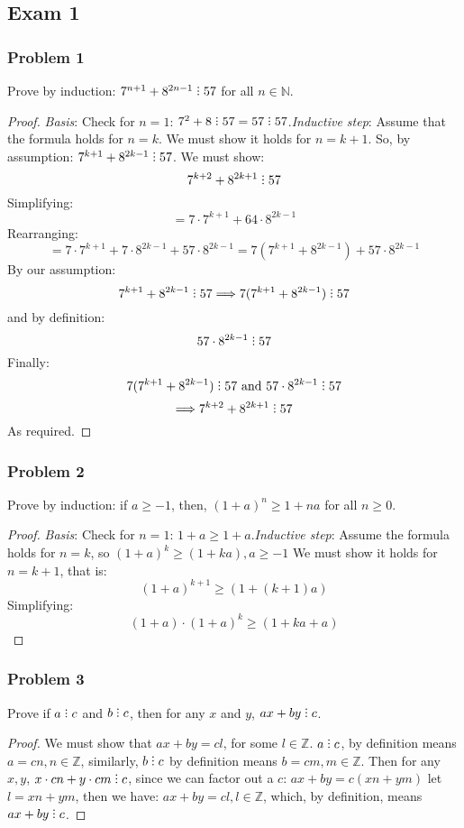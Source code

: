 \documentclass[hidelinks,12pt]{article}
\newcommand{\N}{\mathbb{N}}
\newcommand{\Z}{\mathbb{Z}}
\newcommand{\divby}{%
  \mathrel{\text{\vbox{\baselineskip.65ex\lineskiplimit0pt\hbox{.}\hbox{.}\hbox{.}}}}%
  }
\begin{document}
\subsection{Exam 1}
\subsubsection{Problem 1}
Prove by induction: $7^{n+1}+8^{2n-1}\divby57$ for all $n\in\N$.
\begin{proof}
\emph{Basis}: Check for $n=1$: $7^2+8\divby57=57\divby57$.\newline \emph{Inductive step}: Assume that the formula holds for $n=k$. We must show it holds for $n=k+1$. So, by assumption: $7^{k+1}+8^{2k-1}\divby57$. We must show: $$7^{k+2}+8^{2k+1}\divby57$$ Simplifying:$$=7\cdot7^{k+1}+64\cdot8^{2k-1}$$ Rearranging:$$=7\cdot7^{k+1}+7\cdot8^{2k-1}+57\cdot8^{2k-1}=7(7^{k+1}+8^{2k-1})+57\cdot8^{2k-1}$$By our assumption:$$7^{k+1}+8^{2k-1}\divby57\Longrightarrow 7(7^{k+1}+8^{2k-1})\divby57$$ and by definition:$$57\cdot8^{2k-1}\divby57$$ Finally:$$7(7^{k+1}+8^{2k-1})\divby57\text{ and } 57\cdot8^{2k-1}\divby57$$ $$\Longrightarrow 7^{k+2}+8^{2k+1}\divby57$$ As required.
\end{proof}
\subsubsection{Problem 2}
Prove by induction: if $a\geq-1$, then, $(1+a)^n\geq1+na$ for all $n\geq0$.
\begin{proof}
\emph{Basis}: Check for $n=1$: $1+a\geq1+a$.\newline \emph{Inductive step}: \newline Assume the formula holds for $n=k$, so $(1+a)^k\geq(1+ka), a\geq-1$ We must show it holds for $n=k+1$, that is: $$(1+a)^{k+1}\geq(1+(k+1)a)$$ Simplifying:$$(1+a)\cdot(1+a)^k\geq(1+ka+a)$$
\end{proof}
\subsubsection{Problem 3}
Prove if $a\divby c$ and $b\divby c$, then for any $x$ and $y$, $ax+by\divby c$.
\begin{proof}
We must show that $ax+by=cl$, for some $l\in\Z$. $a\divby c$, by definition means $a=cn, n\in\Z$, similarly, $b\divby c$ by definition means $b=cm, m\in\Z$. Then for any $x,y$, $x\cdot cn+y\cdot cm \divby c$, since we can factor out a $c$: $ax+by=c(xn+ym)$ let $l=xn+ym$, then we have: $ax+by=cl, l\in\Z$, which, by definition, means $ax+by\divby c$.
\end{proof}
\end{document}
